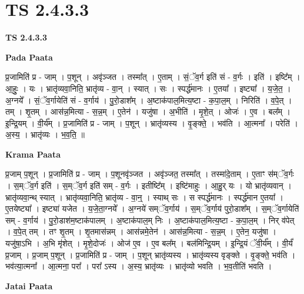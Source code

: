 \documentclass[17pt]{extarticle}
\begin{document}
\section*{ TS 2.4.3.3 }

\textbf{TS 2.4.3.3 } \newline

\textbf{Pada Paata} \newline

प्र॒जामिति॑ प्र - जाम् । प॒शून् । अवृ॑ञ्जत । तस्मा᳚त् । ए॒ताम् । सं॒ॅव॒र्ग इति॑ सं - व॒र्गः । इति॑ । इष्टि᳚म् । आ॒हुः॒ । यः । भ्रातृ॑व्यवा॒निति॒ भ्रातृ॑व्य - वा॒न् । स्यात् । सः । स्पर्द्ध॑मानः । ए॒तया᳚ । इष्ट्या᳚ । य॒जे॒त॒ । अ॒ग्नये᳚ । सं॒ॅव॒र्गायेति॑ सं - व॒र्गाय॑ । पु॒रो॒डाश᳚म् । अ॒ष्टाक॑पाल॒मित्य॒ष्टा - क॒पा॒ल॒म् । निरिति॑ । व॒पे॒त् । तम् । शृ॒तम् । आस॑न्न॒मित्या - स॒न्न॒म् । ए॒तेन॑ । यजु॑षा । अ॒भीति॑ । मृ॒शे॒त् । ओजः॑ । ए॒व । बल᳚म् । इ॒न्द्रि॒यम् । वी॒र्य᳚म् । प्र॒जामिति॑ प्र - जाम् । प॒शून् । भ्रातृ॑व्यस्य । वृ॒ङ्क्ते॒ । भव॑ति । आ॒त्मना᳚ । परेति॑ । अ॒स्य॒ । भ्रातृ॑व्यः । भ॒व॒ति॒ ॥  \newline


\textbf{Krama Paata} \newline

प्र॒जाम् प॒शून् । प्र॒जामिति॑ प्र - जाम् । प॒शूनवृ॑ञ्जत । अवृ॑ञ्जत॒ तस्मा᳚त् । तस्मा॑दे॒ताम् । ए॒ताꣳ स॑म्ॅव॒र्गः । स॒म्ॅव॒र्ग इति॑ । स॒म्ॅव॒र्ग इति॑ सम् - व॒र्गः । इतीष्टि᳚म् । इष्टि॑माहुः । आ॒हु॒र् यः । यो भ्रातृ॑व्यवान् । भ्रातृ॑व्यवा॒न्थ् स्यात् । भ्रातृ॑व्यवा॒निति॒ भ्रातृ॑व्य - वा॒न्॒ । स्याथ् सः । स स्पर्द्ध॑मानः । स्पर्द्ध॑मान ए॒तया᳚ । ए॒तयेष्ट्या᳚ । इष्ट्या॑ यजेत । य॒जे॒ता॒ग्नये᳚ । अ॒ग्नये॑ सम्ॅव॒र्गाय॑ । स॒म्ॅव॒र्गाय॑ पुरो॒डाश᳚म् । स॒म्ॅव॒र्गायेति॑ सम् - व॒र्गाय॑ । पु॒रो॒डाश॑म॒ष्टाक॑पालम् । अ॒ष्टाक॑पाल॒म् निः । अ॒ष्टाक॑पाल॒मित्य॒ष्टा - क॒पा॒ल॒म् । निर् व॑पेत् । व॒पे॒त् तम् । तꣳ शृ॒तम् । शृ॒तमास॑न्नम् । आस॑न्नमे॒तेन॑ । आस॑न्न॒मित्या - स॒न्न॒म् । ए॒तेन॒ यजु॑षा । यजु॑षा॒ऽभि । अ॒भि मृ॑शेत् । मृ॒शे॒दोजः॑ । ओज॑ ए॒व । ए॒व बल᳚म् । बल॑मिन्द्रि॒यम् । इ॒न्द्रि॒यं ॅवी॒र्य᳚म् । वी॒र्यं॑ प्र॒जाम् । प्र॒जाम् प॒शून् । प्र॒जामिति॑ प्र - जाम् । प॒शून् भ्रातृ॑व्यस्य । भ्रातृ॑व्यस्य वृङ्क्ते । वृ॒ङ्क्ते॒ भव॑ति । भव॑त्या॒त्मना᳚ । आ॒त्मना॒ परा᳚ । परा᳚ ऽस्य । अ॒स्य॒ भ्रातृ॑व्यः । भ्रातृ॑व्यो भवति । भ॒व॒तीति॑ भवति । \newline

\textbf{Jatai Paata} \newline
\end{document}
